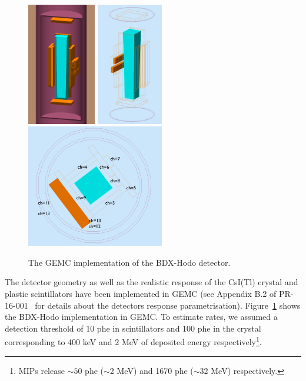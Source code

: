 \begin{figure}[h!] 
\center
\includegraphics[width=2.99cm]{figs/gemc-3d.pdf}  
\includegraphics[width=2.9cm]{figs/gemc-3d1.pdf}  
\includegraphics[width=6.0cm]{figs/gemc-3d2.pdf}  
\caption{The GEMC  implementation of the BDX-Hodo detector.}
\label{fig:det-gemc}
\end{figure}


The  detector geometry as well as the realistic response of the CsI(Tl) crystal and plastic scintillators have been implemented in GEMC (see  Appendix B.2 of PR-16-001~\cite{bdx-proposal} for details about the detectors response  parametrisation). 
Figure~\ref{fig:det-gemc} shows the BDX-Hodo implementation in GEMC. 
To estimate rates, we assumed a detection threshold of 10 phe in scintillators and 100 phe in the crystal corresponding to 400 keV and 2 MeV of deposited energy respectively\footnote{MIPs release $\sim50$ phe ($\sim$2 MeV) and 1670 phe ($\sim$32 MeV)  respectively.}. 


